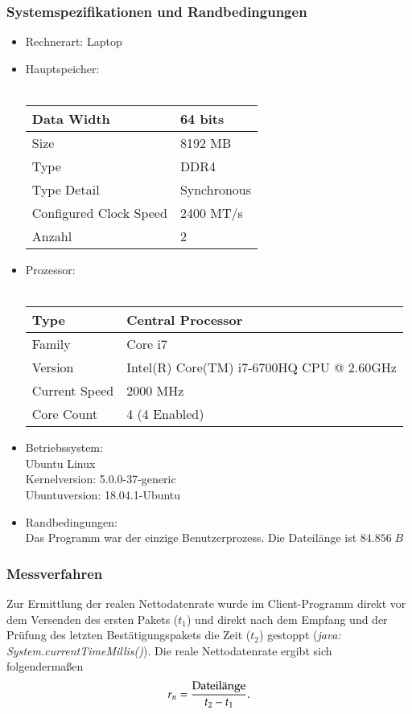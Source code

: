 \documentclass{scrartcl}
\begin{document}
\subsubsection{Systemspezifikationen und Randbedingungen}
\begin{itemize}
	\item Rechnerart: Laptop
	\item Hauptspeicher: \\ \\
	\begin{tabular}{||l|l||}
	\hline
	Data Width & 64 bits\\
	\hline	
	Size & 8192 MB\\
	\hline
	Type & DDR4\\
	\hline
	Type Detail & Synchronous\\
	\hline
	Configured Clock Speed & 2400 MT/s\\
	\hline
	Anzahl & 2\\
	\hline
	\end{tabular}	

	\item Prozessor: \\ \\
	\begin{tabular}{||l|l||}
	\hline
	Type & Central Processor\\
	\hline
	Family & Core i7\\
	\hline
	Version & Intel(R) Core(TM) i7-6700HQ CPU @ 2.60GHz\\
	\hline
	Current Speed & 2000 MHz\\
	\hline
	Core Count & 4 (4 Enabled)\\
	\hline
	\end{tabular}

	\item Betriebssystem: \\
	Ubuntu Linux\\
	Kernelversion: 5.0.0-37-generic\\
	Ubuntuversion: 18.04.1-Ubuntu

	\item Randbedingungen:\\
	Das Programm war der einzige Benutzerprozess. Die Dateilänge ist $84.856\; B$
\end{itemize}

\subsubsection{Messverfahren}
Zur Ermittlung der realen Nettodatenrate wurde im Client-Programm direkt vor dem Versenden des ersten Pakets ($t_1$) und direkt nach dem Empfang und der Prüfung des letzten Bestätigungspakets die Zeit ($t_2$) gestoppt (\textit{java: System.currentTimeMillis()}).  Die reale Nettodatenrate ergibt sich folgendermaßen $$r_n = \frac{\textnormal{Dateilänge}}{t_2 - t_1}.$$
\end{document}
